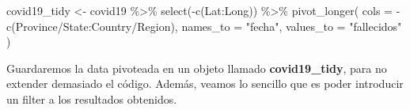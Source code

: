 \documentclass[
]{book}
\newenvironment{Shaded}{\begin{snugshade}}{\end{snugshade}}
\newcommand{\AttributeTok}[1]{\textcolor[rgb]{0.77,0.63,0.00}{#1}}
\newcommand{\FunctionTok}[1]{\textcolor[rgb]{0.00,0.00,0.00}{#1}}
\newcommand{\NormalTok}[1]{#1}
\newcommand{\OtherTok}[1]{\textcolor[rgb]{0.56,0.35,0.01}{#1}}
\newcommand{\SpecialCharTok}[1]{\textcolor[rgb]{0.00,0.00,0.00}{#1}}
\newcommand{\StringTok}[1]{\textcolor[rgb]{0.31,0.60,0.02}{#1}}
\begin{document}
\begin{Shaded}
\begin{Highlighting}[]
\NormalTok{covid19\_tidy }\OtherTok{\textless{}{-}}\NormalTok{ covid19 }\SpecialCharTok{\%\textgreater{}\%}
  \FunctionTok{select}\NormalTok{(}\SpecialCharTok{{-}}\FunctionTok{c}\NormalTok{(Lat}\SpecialCharTok{:}\NormalTok{Long)) }\SpecialCharTok{\%\textgreater{}\%}
  \FunctionTok{pivot\_longer}\NormalTok{(}
    \AttributeTok{cols =} \SpecialCharTok{{-}}\FunctionTok{c}\NormalTok{(}\StringTok{\textasciigrave{}}\AttributeTok{Province/State}\StringTok{\textasciigrave{}}\SpecialCharTok{:}\StringTok{\textasciigrave{}}\AttributeTok{Country/Region}\StringTok{\textasciigrave{}}\NormalTok{),}
    \AttributeTok{names\_to =} \StringTok{"fecha"}\NormalTok{,}
    \AttributeTok{values\_to =} \StringTok{"fallecidos"}
\NormalTok{  )}
\end{Highlighting}
\end{Shaded}

Guardaremos la data pivoteada en un objeto llamado \textbf{covid19\_tidy}, para no extender demasiado el código. Además, veamos lo sencillo que es poder introducir un filter a los resultados obtenidos.
\end{document}
